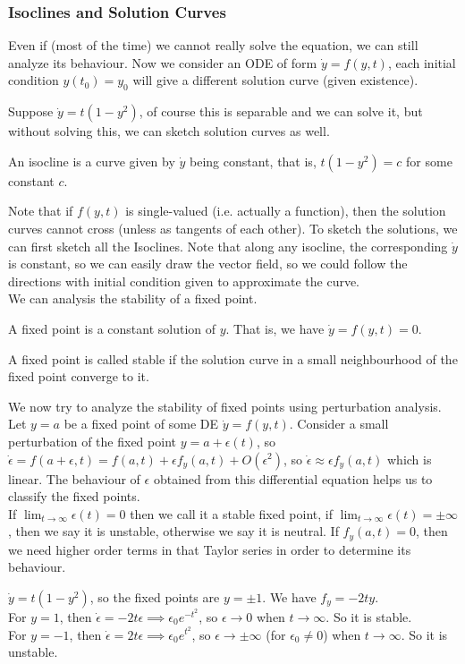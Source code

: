 \subsubsection{Isoclines and Solution Curves}
Even if (most of the time) we cannot really solve the equation, we can still analyze its behaviour.
Now we consider an ODE of form $\dot{y}=f(y,t)$, each initial condition $y(t_0)=y_0$ will give a different solution curve (given existence).
\begin{example}
    Suppose $\dot{y}=t(1-y^2)$, of course this is separable and we can solve it, but without solving this, we can sketch solution curves as well.
\end{example}
\begin{definition}
    An isocline is a curve given by $\dot{y}$ being constant, that is, $t(1-y^2)=c$ for some constant $c$.
\end{definition}
Note that if $f(y,t)$ is single-valued (i.e. actually a function), then the solution curves cannot cross (unless as tangents of each other).
To sketch the solutions, we can first sketch all the Isoclines.
Note that along any isocline, the corresponding $\dot{y}$ is constant, so we can easily draw the vector field, so we could follow the directions with initial condition given to approximate the curve.\\
We can analysis the stability of a fixed point.
\begin{definition}
    A fixed point is a constant solution of $y$.
	That is, we have $\dot{y}=f(y,t)=0$.
\end{definition}
\begin{definition}
    A fixed point is called stable if the solution curve in a small neighbourhood of the fixed point converge to it.
\end{definition}
We now try to analyze the stability of fixed points using perturbation analysis.\\
Let $y=a$ be a fixed point of some DE $\dot{y}=f(y,t)$.
Consider a small perturbation of the fixed point $y=a+\epsilon(t)$, so $\dot{\epsilon}=f(a+\epsilon,t)=f(a,t)+\epsilon f_y(a,t)+O(\epsilon^2)$, so $\dot{\epsilon}\approx\epsilon f_y(a,t)$ which is linear.
The behaviour of $\epsilon$ obtained from this differential equation helps us to classify the fixed points.\\
If $\lim_{t\to\infty }\epsilon(t)=0$ then we call it a stable fixed point, if $\lim_{t\to\infty}\epsilon(t)=\pm\infty$, then we say it is unstable, otherwise we say it is neutral.
If $f_y(a,t)=0$, then we need higher order terms in that Taylor series in order to determine its behaviour.
\begin{example}
    $\dot{y}=t(1-y^2)$, so the fixed points are $y=\pm 1$.
    We have $f_y=-2ty$.\\
    For $y=1$, then $\dot{\epsilon}=-2t\epsilon\implies \epsilon_{0}e^{-t^2}$, so $\epsilon\to 0$ when $t\to\infty$.
    So it is stable.\\
    For $y=-1$, then $\dot{\epsilon}=2t\epsilon\implies \epsilon_{0}e^{t^2}$, so $\epsilon\to\pm\infty$ (for $\epsilon_0\neq 0$) when $t\to\infty$.
    So it is unstable.
\end{example}
